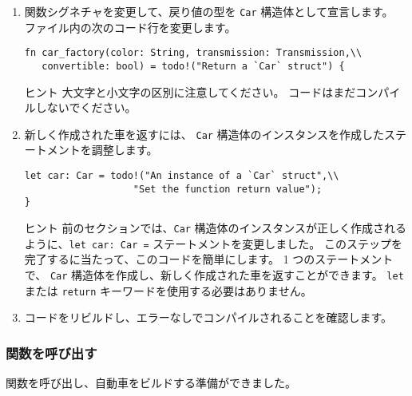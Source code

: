 \begin{enumerate}
\item 関数シグネチャを変更して、戻り値の型を \texttt{Car} 構造体として宣言します。 ファイル内の次のコード行を変更します。

\begin{lstlisting}[numbers=none]
fn car_factory(color: String, transmission: Transmission,\\
   convertible: bool) = todo!("Return a `Car` struct") {
\end{lstlisting}

\begin{itembox}[l]{ヒント}
大文字と小文字の区別に注意してください。 コードはまだコンパイルしないでください。
\end{itembox}

\item 新しく作成された車を返すには、 \texttt{Car} 構造体のインスタンスを作成したステートメントを調整します。

\begin{lstlisting}[numbers=none]
    let car: Car = todo!("An instance of a `Car` struct",\\
                   "Set the function return value");
}
\end{lstlisting}

\begin{itembox}[l]{ヒント}
前のセクションでは、\texttt{Car} 構造体のインスタンスが正しく作成されるように、\texttt{let car: Car =} ステートメントを変更しました。 このステップを完了するに当たって、このコードを簡単にします。 1 つのステートメントで、 \texttt{Car} 構造体を作成し、新しく作成された車を返すことができます。 \texttt{let} または \texttt{return} キーワードを使用する必要はありません。
\end{itembox}

\item コードをリビルドし、エラーなしでコンパイルされることを確認します。
\end{enumerate}


\subsubsection{関数を呼び出す}

関数を呼び出し、自動車をビルドする準備ができました。

